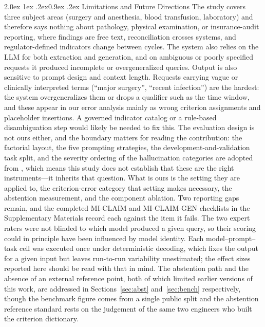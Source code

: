 \documentclass[10pt]{article}
\makeatletter
\renewcommand\subsection{\@startsection{subsection}{2}{\z@}%
  {2.0ex \@plus 1ex \@minus .2ex}{0.9ex \@plus .2ex}%
  {\normalfont\normalsize\bfseries}}
\makeatother
\begin{document}
\subsection{Limitations and Future Directions}
The study covers three subject areas (surgery and anesthesia, blood transfusion, laboratory) and therefore says nothing about pathology, physical examination, or insurance-audit reporting, where findings are free text, reconciliation crosses systems, and regulator-defined indicators change between cycles. The system also relies on the LLM for both extraction and generation, and on ambiguous or poorly specified requests it produced incomplete or overgeneralized queries.
Output is also sensitive to prompt design and context length. Requests carrying vague or clinically interpreted terms (``major surgery'', ``recent infection'') are the hardest: the system overgeneralizes them or drops a qualifier such as the time window, and these appear in our error analysis mainly as wrong criterion assignments and placeholder insertions. A governed indicator catalog or a rule-based disambiguation step would likely be needed to fix this. The evaluation design is not ours either, and the boundary matters for reading the contribution: the factorial layout, the five prompting strategies, the development-and-validation task split, and the severity ordering of the hallucination categories are adopted from \cite{lee2025}, which means this study does not establish that these are the right instruments---it inherits that question. What is ours is the setting they are applied to, the criterion-error category that setting makes necessary, the abstention measurement, and the component ablation. Two reporting gaps remain, and the completed MI-CLAIM and MI-CLAIM-GEN checklists in the Supplementary Materials record each against the item it fails. The two expert raters were not blinded to which model produced a given query, so their scoring could in principle have been influenced by model identity. Each model--prompt--task cell was executed once under deterministic decoding, which fixes the output for a given input but leaves run-to-run variability unestimated; the effect sizes reported here should be read with that in mind. The abstention path and the absence of an external reference point, both of which limited earlier versions of this work, are addressed in Sections~\ref{sec:abst} and~\ref{sec:bench} respectively, though the benchmark figure comes from a single public split and the abstention reference standard rests on the judgement of the same two engineers who built the criterion dictionary.
\end{document}
